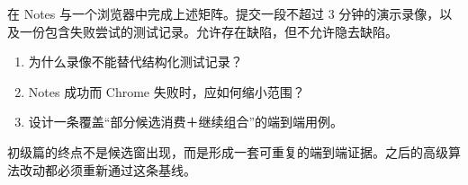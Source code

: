 
\begin{lab}[初级篇里程碑]
在 Notes 与一个浏览器中完成上述矩阵。提交一段不超过 3 分钟的演示录像，以及一份包含失败尝试的测试记录。允许存在缺陷，但不允许隐去缺陷。
\end{lab}

\exercises
\begin{enumerate}
  \item 为什么录像不能替代结构化测试记录？
  \item Notes 成功而 Chrome 失败时，应如何缩小范围？
  \item 设计一条覆盖“部分候选消费＋继续组合”的端到端用例。
\end{enumerate}

\begin{summarybox}
初级篇的终点不是候选窗出现，而是形成一套可重复的端到端证据。之后的高级算法改动都必须重新通过这条基线。
\end{summarybox}
